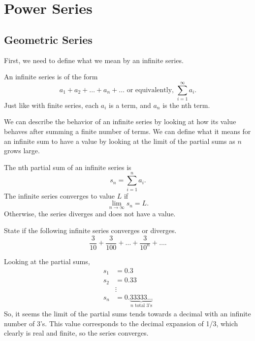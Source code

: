 \section{Power Series}
\subsection{Geometric Series}
First, we need to define what we mean by an infinite series.
\begin{definition}
	An infinite series is of the form
	\begin{equation*}
		a_1 + a_2 + \ldots + a_n + \ldots \text{ or equivalently, } \sum_{i=1}^{\infty}{a_i}.
	\end{equation*}
	Just like with finite series, each $a_i$ is a term, and $a_n$ is the nth term.
\end{definition}
\noindent
We can describe the behavior of an infinite series by looking at how its value behaves after summing a finite number of terms.
We can define what it means for an infinite sum to have a value by looking at the limit of the partial sums as $n$ grows large.
\begin{definition}
	The nth partial sum of an infinite series is
	\begin{equation*}
		s_n = \sum_{i=1}^{n}{a_i}.
	\end{equation*}
	The infinite series converges to value $L$ if
	\begin{equation*}
		\lim_{n\to\infty}{s_n} = L.
	\end{equation*}
	Otherwise, the series diverges and does not have a value.
\end{definition}

\begin{example}
	State if the following infinite series converges or diverges.
	\begin{equation*}
		\frac{3}{10} + \frac{3}{100} + \ldots + \frac{3}{10^n} + \ldots.
	\end{equation*}
\end{example}
Looking at the partial sums,
\begin{align*}
	s_1 &= 0.3 \\
	s_2 &= 0.33 \\
	&\vdots \\
	s_n &= 0.\underbrace{33333\ldots}_{\text{$n$ total 3's}}
\end{align*}
\indent
So, it seems the limit of the partial sums tends towards a decimal with an infinite number of 3's.
This value corresponds to the decimal expansion of 1/3, which clearly is real and finite, so the series converges. \\

